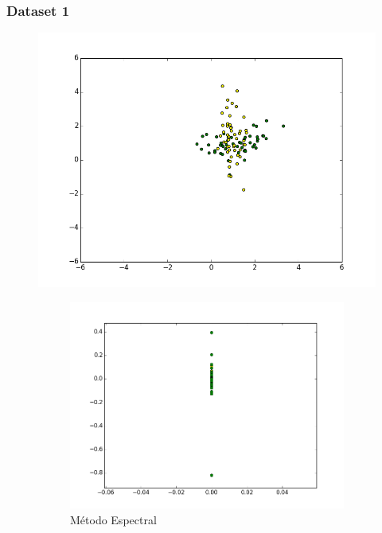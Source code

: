 \documentclass[a4paper,12pt]{article}    %
\begin{document}
\subsubsection{Dataset 1}
\begin{figure}[!hb]
	\centering
	\includegraphics[width=\linewidth]{img/1dataset.png}
	\caption*{N=100, cov1=[[0.1, 0], [0, 2]], cov2=[[0.9, 0.2], [0.2, 0.3]]}
	\begin{subfigure}{.45\textwidth}
		\centering
		\includegraphics[width=\linewidth]{img/2spectral.png}
		\caption{Método Espectral}
	\end{subfigure}
	\begin{subfigure}{.45\textwidth}
		\centering

\end{subfigure}
\end{figure}
\end{document}
